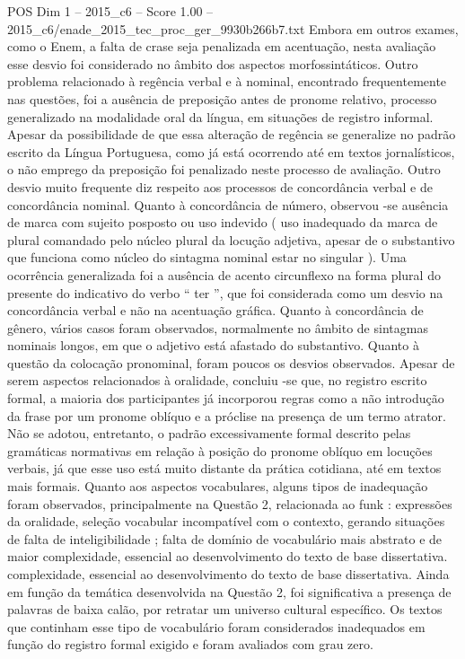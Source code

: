 \begin{textsample}{POS Dim 1 – 2015\_c6 – Score 1.00 – 2015\_c6/enade\_2015\_tec\_proc\_ger\_9930b266b7.txt}
Embora em outros exames, como o Enem, a falta de crase seja penalizada em acentuação, nesta avaliação esse desvio foi considerado no âmbito dos aspectos morfossintáticos.
Outro problema relacionado à regência verbal e à nominal, encontrado frequentemente nas questões, foi a ausência de preposição antes de pronome relativo, processo generalizado na modalidade oral da língua, em situações de registro informal.
Apesar da possibilidade de que essa alteração de regência se generalize no padrão escrito da Língua Portuguesa, como já está ocorrendo até em textos jornalísticos, o não emprego da preposição foi penalizado neste processo de avaliação.
Outro desvio muito frequente diz respeito aos processos de concordância verbal e de concordância nominal.
Quanto à concordância de número, observou -se ausência de marca com sujeito posposto ou uso indevido ( uso inadequado da marca de plural comandado pelo núcleo plural da locução adjetiva, apesar de o substantivo que funciona como núcleo do sintagma nominal estar no singular ).
Uma ocorrência generalizada foi a ausência de acento circunflexo na forma plural do presente do indicativo do verbo “ ter ”, que foi considerada como um desvio na concordância verbal e não na acentuação gráfica.
Quanto à concordância de gênero, vários casos foram observados, normalmente no âmbito de sintagmas nominais longos, em que o adjetivo está afastado do substantivo.
Quanto à questão da colocação pronominal, foram poucos os desvios observados.
Apesar de serem aspectos relacionados à oralidade, concluiu -se que, no registro escrito formal, a maioria dos participantes já incorporou regras como a não introdução da frase por um pronome oblíquo e a próclise na presença de um termo atrator.
Não se adotou, entretanto, o padrão excessivamente formal descrito pelas gramáticas normativas em relação à posição do pronome oblíquo em locuções verbais, já que esse uso está muito distante da prática cotidiana, até em textos mais formais.
Quanto aos aspectos vocabulares, alguns tipos de inadequação foram observados, principalmente na Questão 2, relacionada ao funk : expressões da oralidade, seleção vocabular incompatível com o contexto, gerando situações de falta de inteligibilidade ; falta de domínio de vocabulário mais abstrato e de maior complexidade, essencial ao desenvolvimento do texto de base dissertativa. complexidade, essencial ao desenvolvimento do texto de base dissertativa.
Ainda em função da temática desenvolvida na Questão 2, foi significativa a presença de palavras de baixa calão, por retratar um universo cultural específico.
Os textos que continham esse tipo de vocabulário foram considerados inadequados em função do registro formal exigido e foram avaliados com grau zero.

\end{textsample}
